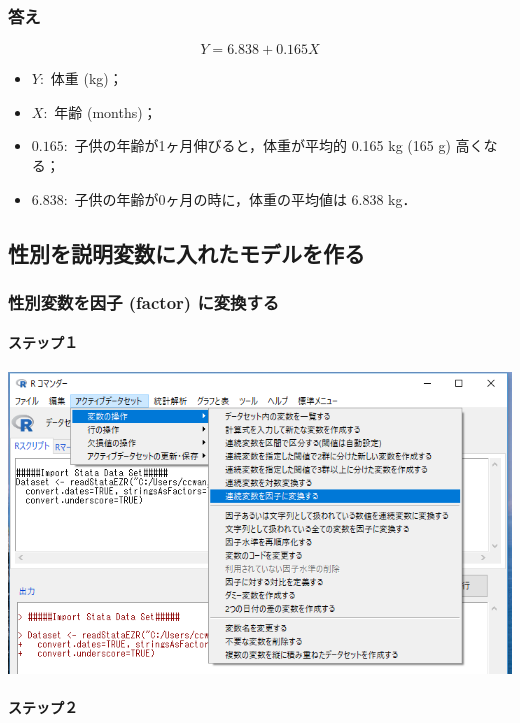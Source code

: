 \documentclass[11pt,]{problemset}
\providecommand{\tightlist}{%
  \setlength{\itemsep}{0pt}\setlength{\parskip}{0pt}}
\let\oldparagraph\paragraph
\renewcommand{\paragraph}[1]{\oldparagraph{#1}\mbox{}}
\begin{document}
\hypertarget{-3}{%
\subsubsection{答え}\label{-3}}

\[
Y = 6.838 + 0.165 X
\]

\begin{itemize}
\tightlist
\item
  \(Y:\) 体重 (kg)；
\item
  \(X:\) 年齢 (months)；
\item
  \(0.165:\) 子供の年齢が1ヶ月伸びると，体重が平均的 0.165 kg (165 g)
  高くなる；
\item
  \(6.838:\) 子供の年齢が0ヶ月の時に，体重の平均値は 6.838 kg．
\end{itemize}

\subsection{性別を説明変数に入れたモデルを作る}

\hypertarget{-factor-}{%
\subsubsection{性別変数を因子 (factor) に変換する}\label{-factor-}}

\hypertarget{-8}{%
\paragraph{ステップ１}\label{-8}}

\begin{center}\includegraphics[width=0.8\linewidth]{pic/sexfactor00} \end{center}

\hypertarget{-9}{%
\paragraph{ステップ２}\label{-9}}
\end{document}
